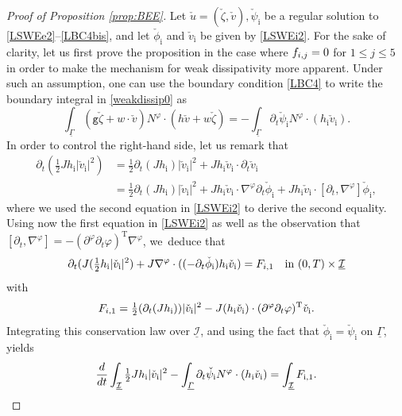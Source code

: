 \documentclass[11pt]{article}
\newcommand{\abs}[1]{\vert#1\vert}
\newcommand{\gr}{{\mathtt g}}
\newcommand{\dt}{\partial_t}
\newcommand{\cI}{{\mathcal I}}
\newcommand{\ul}[1]{\underline{#1}}
\newcommand{\itGamma}{\mathit{\Gamma}}
\theoremstyle{definition}
\begin{document}
\begin{proof}[Proof of Proposition \ref{prop:BEE}]
Let $\check{u}=(\check{\zeta},\check{v}), \check{\psi}_\mathrm{i}$ be a regular solution to \eqref{LSWEe2}--\eqref{LBC4bis},
and let $\check{\phi}_\mathrm{i}$ and $\check{v}_\mathrm{i}$ be given by \eqref{LSWEi2}.
For the sake of clarity, let us first prove the proposition in the case where $f_{{\rm i},j}=0$ for $1\leq j\leq 5$
in order to make the mechanism for weak dissipativity more apparent.
Under such an assumption, one can use the boundary condition \eqref{LBC4} to write the boundary integral in \eqref{weakdissip0} as
\begin{equation}\label{weakdissip1}
\int_{\ul{\itGamma}} (\gr \check{\zeta}+w\cdot\check{v})N^\varphi\cdot (h \check{v}+w\check{\zeta})
= -\int_{\ul{\itGamma}} \dt \check{\psi}_\mathrm{i} N^\varphi\cdot (h_\mathrm{i}\check{v}_\mathrm{i}).
\end{equation}
In order to control the right-hand side, let us remark that
\begin{align*}
\dt (\tfrac{1}{2}Jh_\mathrm{i}\abs{\check{v}_\mathrm{i}}^2)
&= \tfrac{1}{2}\dt(J h_\mathrm{i}) \abs{\check{v}_\mathrm{i}}^2+J h_\mathrm{i}\check{v}_\mathrm{i}\cdot \dt \check{v}_\mathrm{i} \\
&= \tfrac{1}{2}\dt(J h_\mathrm{i}) \abs{\check{v}_\mathrm{i}}^2+J h_\mathrm{i}\check{v}_\mathrm{i}\cdot \nabla^\varphi \dt \check{\phi}_\mathrm{i}
+ J h_\mathrm{i}\check{v}_\mathrm{i}\cdot [\dt,\nabla^\varphi] \check{\phi}_\mathrm{i},
\end{align*}
where we used the second equation in \eqref{LSWEi2} to derive the second equality.
Using now the first equation in \eqref{LSWEi2} as well as the observation that $[\dt,\nabla^\varphi]=-(\partial^\varphi\dt\varphi)^\mathrm{T}\nabla^\varphi$, we~deduce that
\begin{equation}\label{weakdissip2}
\dt(J(\tfrac12h_\mathrm{i}|\check{v}_\mathrm{i}|^2)
+ J\nabla^\varphi\cdot((-\dt\check{\phi}_\mathrm{i})h_\mathrm{i}\check{v}_\mathrm{i}) = F_{{\rm i},1} \quad\text{in } (0,T)\times\ul{\cI}
\end{equation}
with
\[
F_{{\rm i},1} = \tfrac12(\dt(Jh_\mathrm{i}))|\check{v}_\mathrm{i}|^2 - J(h_\mathrm{i}\check{v}_\mathrm{i})\cdot (\partial^\varphi\dt\varphi)^\mathrm{T}\check{v}_\mathrm{i}.
\]
Integrating this conservation law over $\ul{\cI}$, and using the fact that $\check{\phi}_\mathrm{i}=\check{\psi}_\mathrm{i}$ on $\ul{\itGamma}$, yields
\[
\frac{{\rm d}}{{\rm d}t} \int_{\ul{\cI}} \tfrac12 J h_\mathrm{i}\abs{\check{v}_\mathrm{i}}^2
- \int_{\ul{\itGamma}} \dt \check{\psi}_\mathrm{i} N^\varphi\cdot (h_\mathrm{i}\check{v}_\mathrm{i}) = \int_{\ul\cI}F_\mathrm{i,1}.
\]
\end{proof}
\end{document}
